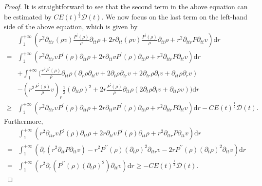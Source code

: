 \documentclass[10pt,reqno]{amsart}
\numberwithin{equation}{section}
\begin{document}
\begin{proof}
		It is straightforward to see that the second term in the above equation can be estimated by $CE(t)^{\frac{1}{2}} \mathcal{D}(t)$.
		We now focus on the last term on the left-hand side of the above equation, which is given by
		\begin{equation}\nonumber
			\begin{aligned}
				&\int_{1}^{+\infty}\left(r^2\partial_{ttr}(\rho v)\frac{ P^{\prime}(\rho)}{\rho}\partial_{tt}\rho
				+2r\partial_{tt}(\rho v)\frac{ P^{\prime}(\rho)}{\rho}\partial_{tt}\rho+r^2\partial_{ttr}P \partial_{tt}v\right) \mathrm{d}r\\
				=&\int_{1}^{+\infty} \left(r^2\partial_{ttr}vP^{\prime}(\rho)\partial_{tt}\rho
				+2r\partial_{tt}vP^{\prime}(\rho)\partial_{tt}\rho+r^2\partial_{ttr}P \partial_{tt}v\right)\mathrm{d}r \\
				&+\int_{1}^{+\infty}\bigg(\frac{r^2 P^{\prime}(\rho)}{\rho}\partial_{tt}\rho
				\left(\partial_{r}\rho \partial_{tt}v+2\partial_{t}\rho \partial_{tr}v +2\partial_{tr}\rho \partial_{t}v+\partial_{tt}\rho \partial_{r}v\right)\\
				&-\left(r^2\frac{ P^{\prime}(\rho)}{\rho}v\right)_r \frac{1}{2}(\partial_{tt}\rho)^2
				+2r\frac{ P^{\prime}(\rho)}{\rho} \partial_{tt}\rho\left(2\partial_{t}\rho \partial_{t}v+\partial_{tt}\rho v\right)\bigg) \mathrm{d}r\\
				\geq&\int_{1}^{+\infty} \left(r^2\partial_{ttr}vP^{\prime}(\rho)\partial_{tt}\rho
				+2r\partial_{tt}vP^{\prime}(\rho)\partial_{tt}\rho+r^2\partial_{ttr}P \partial_{tt}v\right) \mathrm{d}r
				-C E(t)^{\frac{1}{2}} \mathcal{D}(t).
			\end{aligned}
		\end{equation}
		Furthermore,
		\begin{equation}\nonumber
			\begin{aligned}
				&\int_{1}^{+\infty} \left(r^2\partial_{ttr}vP^{\prime}(\rho)\partial_{tt}\rho
				+2r\partial_{tt}vP^{\prime}(\rho)\partial_{tt}\rho+r^2\partial_{ttr}P \partial_{tt}v\right) \mathrm{d}r\\
				=&\int_{1}^{+\infty}\left(\partial_{r}\left(r^2\partial_{tt}P\partial_{tt}v\right)-r^2P^{\prime\prime}(\rho)(\partial_{t}\rho)^2\partial_{ttr}v
				-2rP^{\prime\prime}(\rho)(\partial_{t}\rho)^2\partial_{tt}v\right)\mathrm{d}r\\
				=&\int_{1}^{+\infty}\left(r^2 \partial_{r}\left(P^{\prime\prime}(\rho)(\partial_{t}\rho)^2\right)\partial_{tt}v\right)\mathrm{d}r \ge-CE(t)^{\frac{1}{2}} \mathcal{D}(t).
			\end{aligned}

\end{equation}
\end{proof}
\end{document}
